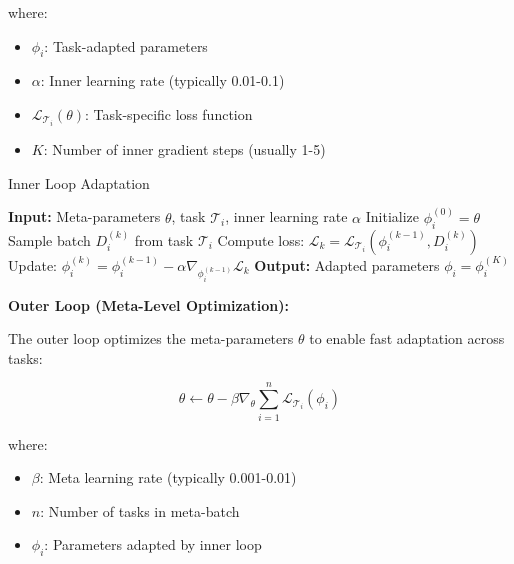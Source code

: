 \documentclass[12pt]{article}
\newcommand{\ieee}[1]{\textcolor{IEEEBlue}{\textbf{#1}}}
\begin{document}
{{			where:
			\begin{itemize}
				\item $\phi_i$: Task-adapted parameters
				\item $\alpha$: Inner learning rate (typically 0.01-0.1)
				\item $\mathcal{L}_{\mathcal{T}_i}(\theta)$: Task-specific loss function
				\item $K$: Number of inner gradient steps (usually 1-5)
			\end{itemize}
			
			\begin{algorithm}[H]
			\caption{Inner Loop Adaptation}
			\begin{algorithmic}[1]
			\STATE \textbf{Input:} Meta-parameters $\theta$, task $\mathcal{T}_i$, inner learning rate $\alpha$
			\STATE Initialize $\phi_i^{(0)} = \theta$
			\STATE Sample batch $D_i^{(k)}$ from task $\mathcal{T}_i$
			\STATE Compute loss: $\mathcal{L}_k = \mathcal{L}_{\mathcal{T}_i}(\phi_i^{(k-1)}, D_i^{(k)})$
			\STATE Update: $\phi_i^{(k)} = \phi_i^{(k-1)} - \alpha \nabla_{\phi_i^{(k-1)}} \mathcal{L}_k$
			\ENDFOR
			\STATE \textbf{Output:} Adapted parameters $\phi_i = \phi_i^{(K)}$
			\end{algorithmic}
			\end{algorithm}
			
			\ieee{Outer Loop (Meta-Level Optimization):}
			
			The outer loop optimizes the meta-parameters $\theta$ to enable fast adaptation across tasks:
			
			\begin{equation}
			\theta \leftarrow \theta - \beta \nabla_\theta \sum_{i=1}^{n} \mathcal{L}_{\mathcal{T}_i}(\phi_i)
			\end{equation}
			
			where:
			\begin{itemize}
				\item $\beta$: Meta learning rate (typically 0.001-0.01)
				\item $n$: Number of tasks in meta-batch
				\item $\phi_i$: Parameters adapted by inner loop
			\end{itemize}
			
}}
\end{document}

